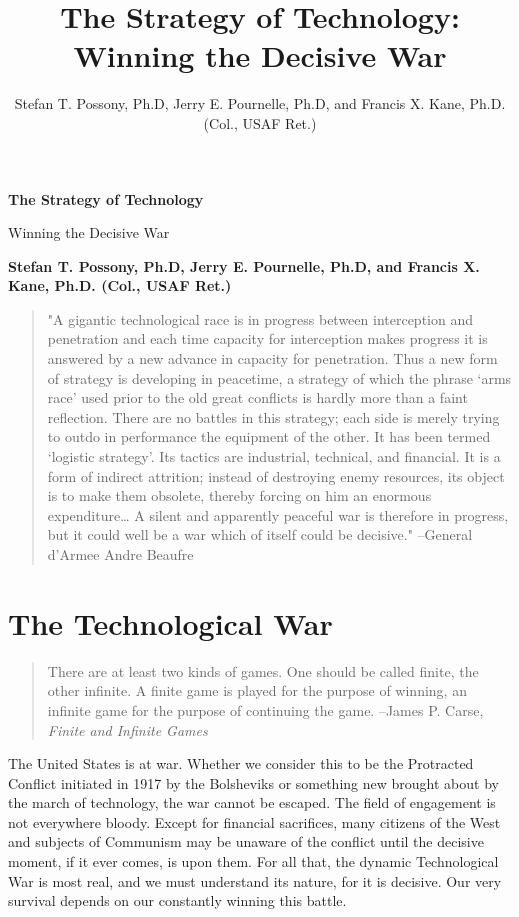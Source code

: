 \documentclass[a4paper,12pt]{book}
\title{The Strategy of Technology: Winning the Decisive War}
\author{Stefan T. Possony, Ph.D, Jerry E. Pournelle, Ph.D, and 
    Francis X. Kane, Ph.D. (Col., USAF Ret.)}
\begin{document}
\begin{titlepage}
   \begin{center}
   \textbf{The Strategy of Technology}
   
   \vspace{0.5cm}
   Winning the Decisive War
   
   \textbf{Stefan T. Possony, Ph.D, Jerry E. Pournelle, Ph.D, and 
    Francis X. Kane, Ph.D. (Col., USAF Ret.)}
   \end{center}
\end{titlepage}


\begin{quotation}
"A gigantic technological race is in progress between interception and penetration and each time capacity for interception makes progress it is answered by a new advance in capacity for penetration. Thus a new form of strategy is developing in peacetime, a strategy of which the phrase ‘arms race’ used prior to the old great conflicts is hardly more than a faint reflection.
\newline
There are no battles in this strategy; each side is merely trying to outdo in performance the equipment of the other. It has been termed ‘logistic strategy’. Its tactics are industrial, technical, and financial. It is a form of indirect attrition; instead of destroying enemy resources, its object is to make them obsolete, thereby forcing on him an enormous expenditure…
\newline
A silent and apparently peaceful war is therefore in progress, but it could well be a war which of itself could be decisive."
\newline
--General d’Armee Andre Beaufre
\end{quotation}

\chapter{The Technological War}

\begin{quotation}
There are at least two kinds of games. One should be called finite, the other infinite. A finite game is played for the purpose of winning, an infinite game for the purpose of continuing the game.
\newline
--James P. Carse, \textit{Finite and Infinite Games}
\end{quotation}

The United States is at war. Whether we consider this to be the Protracted Conflict initiated in 1917 by the Bolsheviks or something new brought about by the march of technology, the war cannot be escaped. The field of engagement is not everywhere bloody. Except for financial sacrifices, many citizens of the West and subjects of Communism may be unaware of the conflict until the decisive moment, if it ever comes, is upon them. For all that, the dynamic Technological War is most real, and we must understand its nature, for it is decisive. Our very survival depends on our constantly winning this battle.
\end{document}
